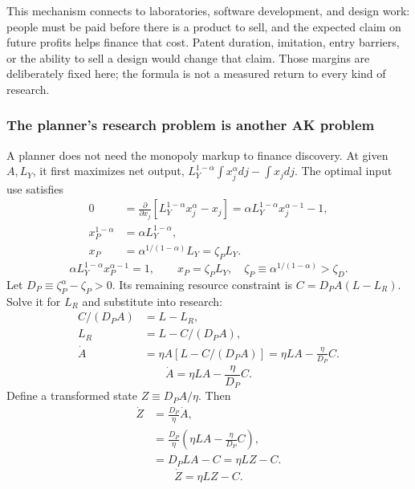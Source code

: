 This mechanism connects to laboratories, software development, and design
work: people must be paid before there is a product to sell, and the expected
claim on future profits helps finance that cost. Patent duration, imitation,
entry barriers, or the ability to sell a design would change that claim.
Those margins are deliberately fixed here; the formula is not a measured
return to every kind of research.

\subsubsection{The planner's research problem is another AK problem}

A planner does not need the monopoly markup to finance discovery. At given
$A,L_Y$, it first maximizes net output,
$L_Y^{1-\alpha}\int x_j^\alpha dj-\int x_jdj$.
The optimal input use satisfies
\begin{align}
0&=\frac{\partial}{\partial x_j}
 [L_Y^{1-\alpha}x_j^\alpha-x_j]
 =\alpha L_Y^{1-\alpha}x_j^{\alpha-1}-1,\\
x_P^{1-\alpha}&=\alpha L_Y^{1-\alpha},\\
x_P&=\alpha^{1/(1-\alpha)}L_Y=\zeta_P L_Y.
\end{align}
\begin{equation}
\alpha L_Y^{1-\alpha}x_P^{\alpha-1}=1,\qquad
x_P=\zeta_P L_Y,\quad \zeta_P\equiv\alpha^{1/(1-\alpha)}>\zeta_D.
\end{equation}
Let $D_P\equiv\zeta_P^\alpha-\zeta_P>0$. Its remaining resource constraint is
$C=D_PA(L-L_R)$. Solve it for $L_R$ and substitute into research:
\begin{align}
C/(D_PA)&=L-L_R,\\
L_R&=L-C/(D_PA),\\
\dot A&=\eta A[L-C/(D_PA)]
       =\eta LA-\frac{\eta}{D_P}C.
\end{align}
\begin{equation}
\dot A=\eta LA-\frac{\eta}{D_P}C.
\end{equation}
Define a transformed state $Z\equiv D_PA/\eta$. Then
\begin{align}
\dot Z&=\frac{D_P}{\eta}\dot A,\\
 &=\frac{D_P}{\eta}
   \left(\eta LA-\frac{\eta}{D_P}C\right),\\
 &=D_PLA-C=\eta LZ-C.
\end{align}
\begin{equation}\label{eq:eg-idea-planner-map}
\dot Z=\eta LZ-C.
\end{equation}
